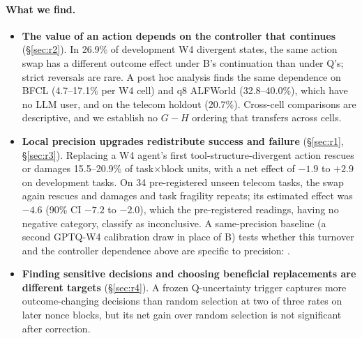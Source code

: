 \paragraph{What we find.}
\begin{itemize}[leftmargin=*,itemsep=1pt,topsep=2pt]
\item \textbf{The value of an action depends on the controller that continues} (\S\ref{sec:r2}). In 26.9\% of development W4 divergent states, the same action swap has a different outcome effect under B's continuation than under Q's; strict reversals are rare. A post hoc analysis finds the same dependence on BFCL (4.7--17.1\% per W4 cell) and q8 ALFWorld (32.8--40.0\%), which have no LLM user, and on the telecom holdout (20.7\%). Cross-cell comparisons are descriptive, and we establish no $G-H$ ordering that transfers across cells. %
\item \textbf{Local precision upgrades redistribute success and failure} (\S\ref{sec:r1}, \S\ref{sec:r3}). Replacing a W4 agent's first tool-structure-divergent action rescues or damages 15.5--20.9\% of task$\times$block units, with a net effect of $-1.9$ to $+2.9$\pp{} on development tasks. On 34 pre-registered unseen telecom tasks, the swap again rescues and damages and task fragility repeats; its estimated effect was $-4.6$\pp{} (90\% CI $-7.2$ to $-2.0$), which the pre-registered readings, having no negative category, classify as inconclusive. A same-precision baseline (a second GPTQ-W4 calibration draw in place of B) tests whether this turnover and the controller dependence above are specific to precision: . %
\item \textbf{Finding sensitive decisions and choosing beneficial replacements are different targets} (\S\ref{sec:r4}). A frozen Q-uncertainty trigger captures more outcome-changing decisions than random selection at two of three rates on later nonce blocks, but its net gain over random selection is not significant after correction. %
\end{itemize}

